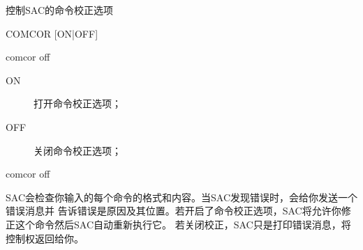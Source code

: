 \label{cmd:comcor}

控制SAC的命令校正选项

\begin{SACSTX}
COMCOR [ON|OFF]
\end{SACSTX}

\begin{SACDFT}
comcor off
\end{SACDFT}

\begin{description}
\item [ON] 打开命令校正选项；
\item [OFF] 关闭命令校正选项；
\end{description}

\begin{SACDFT}
comcor off
\end{SACDFT}

SAC会检查你输入的每个命令的格式和内容。当SAC发现错误时，会给你发送一个错误消息并
告诉错误是原因及其位置。若开启了命令校正选项，SAC将允许你修正这个命令然后SAC自动重新执行它。
若关闭校正，SAC只是打印错误消息，将控制权返回给你。
